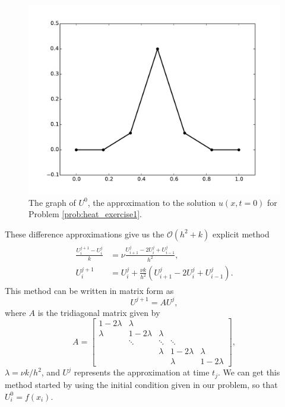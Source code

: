 \begin{figure}
\centering
\includegraphics[width=\textwidth]{heatexercise1a.pdf}
\caption{The graph of $U^{0}$, the approximation to the solution $u(x,t=0)$ for Problem \ref{prob:heat_exercise1}.}
\label{fig:heatexercise1a}
\end{figure}

These difference approximations give us the $\mathcal{O}(h^2 + k)$ explicit method 
\begin{align}
	\begin{split}
	\frac{U_{i}^{j+1} - U_{i}^{j}}{k} &= \nu \frac{U_{i+1}^{j}- 2U_{i}^{j} + U_{i-1}^{j} }{h^2} ,\\ 
	U_{i}^{j+1} &= U_{i}^{j} + \frac{\nu k}{h^2} (U_{i+1}^{j}- 2U_{i}^{j} + U_{i-1}^{j} ). 
	\end{split}\label{eqn:firstorder_explicit}
\end{align}
This method can be written in matrix form as 
\[U^{j+1} = A U^j,\]
where $A$ is the tridiagonal matrix given by 
\[A = \left[\begin{array}{cccccc}1-2\lambda & \lambda & & & \\ \lambda & 1-2\lambda & \lambda & & \\ & \ddots & \ddots & \ddots & \\ & & \lambda & 1-2\lambda & \lambda \\  &  &  & \lambda & 1-2\lambda\end{array}\right],\]
$\lambda = \nu k/h^2$, and $U^j$ represents the approximation at time $t_j$.
We can get this method started by using the initial condition given in our problem, so that $U_{i}^{0} = f(x_i)$. 

